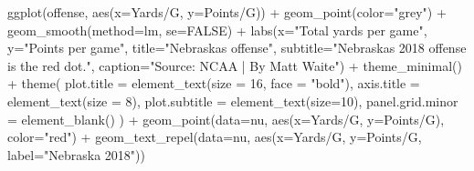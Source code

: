 \documentclass[
  letterpaper,
  DIV=11,
  numbers=noendperiod]{scrreprt}
\newenvironment{Shaded}{\begin{snugshade}}{\end{snugshade}}
\newcommand{\AttributeTok}[1]{\textcolor[rgb]{0.40,0.45,0.13}{#1}}
\newcommand{\ConstantTok}[1]{\textcolor[rgb]{0.56,0.35,0.01}{#1}}
\newcommand{\DecValTok}[1]{\textcolor[rgb]{0.68,0.00,0.00}{#1}}
\newcommand{\FunctionTok}[1]{\textcolor[rgb]{0.28,0.35,0.67}{#1}}
\newcommand{\NormalTok}[1]{\textcolor[rgb]{0.00,0.23,0.31}{#1}}
\newcommand{\SpecialCharTok}[1]{\textcolor[rgb]{0.37,0.37,0.37}{#1}}
\newcommand{\StringTok}[1]{\textcolor[rgb]{0.13,0.47,0.30}{#1}}
\begin{document}
\begin{Shaded}
\begin{Highlighting}[]
\FunctionTok{ggplot}\NormalTok{(offense, }\FunctionTok{aes}\NormalTok{(}\AttributeTok{x=}\StringTok{\textasciigrave{}}\AttributeTok{Yards/G}\StringTok{\textasciigrave{}}\NormalTok{, }\AttributeTok{y=}\StringTok{\textasciigrave{}}\AttributeTok{Points/G}\StringTok{\textasciigrave{}}\NormalTok{)) }\SpecialCharTok{+} 
  \FunctionTok{geom\_point}\NormalTok{(}\AttributeTok{color=}\StringTok{"grey"}\NormalTok{) }\SpecialCharTok{+} \FunctionTok{geom\_smooth}\NormalTok{(}\AttributeTok{method=}\NormalTok{lm, }\AttributeTok{se=}\ConstantTok{FALSE}\NormalTok{) }\SpecialCharTok{+} 
  \FunctionTok{labs}\NormalTok{(}\AttributeTok{x=}\StringTok{"Total yards per game"}\NormalTok{, }\AttributeTok{y=}\StringTok{"Points per game"}\NormalTok{, }\AttributeTok{title=}\StringTok{"Nebraska\textquotesingle{}s offense"}\NormalTok{, }\AttributeTok{subtitle=}\StringTok{"Nebraska\textquotesingle{}s 2018 offense is the red dot."}\NormalTok{, }\AttributeTok{caption=}\StringTok{"Source: NCAA | By Matt Waite"}\NormalTok{) }\SpecialCharTok{+} 
  \FunctionTok{theme\_minimal}\NormalTok{() }\SpecialCharTok{+} 
  \FunctionTok{theme}\NormalTok{(}
    \AttributeTok{plot.title =} \FunctionTok{element\_text}\NormalTok{(}\AttributeTok{size =} \DecValTok{16}\NormalTok{, }\AttributeTok{face =} \StringTok{"bold"}\NormalTok{),}
    \AttributeTok{axis.title =} \FunctionTok{element\_text}\NormalTok{(}\AttributeTok{size =} \DecValTok{8}\NormalTok{), }
    \AttributeTok{plot.subtitle =} \FunctionTok{element\_text}\NormalTok{(}\AttributeTok{size=}\DecValTok{10}\NormalTok{), }
    \AttributeTok{panel.grid.minor =} \FunctionTok{element\_blank}\NormalTok{()}
\NormalTok{    ) }\SpecialCharTok{+}
  \FunctionTok{geom\_point}\NormalTok{(}\AttributeTok{data=}\NormalTok{nu, }\FunctionTok{aes}\NormalTok{(}\AttributeTok{x=}\StringTok{\textasciigrave{}}\AttributeTok{Yards/G}\StringTok{\textasciigrave{}}\NormalTok{, }\AttributeTok{y=}\StringTok{\textasciigrave{}}\AttributeTok{Points/G}\StringTok{\textasciigrave{}}\NormalTok{), }\AttributeTok{color=}\StringTok{"red"}\NormalTok{) }\SpecialCharTok{+} 
  \FunctionTok{geom\_text\_repel}\NormalTok{(}\AttributeTok{data=}\NormalTok{nu, }\FunctionTok{aes}\NormalTok{(}\AttributeTok{x=}\StringTok{\textasciigrave{}}\AttributeTok{Yards/G}\StringTok{\textasciigrave{}}\NormalTok{, }\AttributeTok{y=}\StringTok{\textasciigrave{}}\AttributeTok{Points/G}\StringTok{\textasciigrave{}}\NormalTok{, }\AttributeTok{label=}\StringTok{"Nebraska 2018"}\NormalTok{))}
\end{Highlighting}
\end{Shaded}
\end{document}
